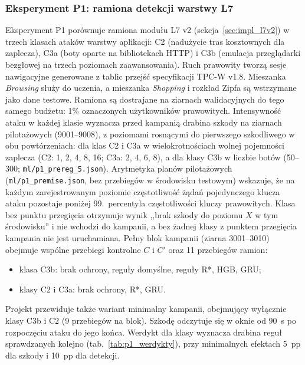 \documentclass[a4paper,12pt]{article}
\begin{document}
\subsubsection{Eksperyment P1: ramiona detekcji warstwy L7}\label{sec:exp_p1}
Eksperyment P1 porównuje ramiona modułu L7 v2 (sekcja~\ref{sec:impl_l7v2}) w trzech klasach ataków warstwy aplikacji: C2 (nadużycie tras kosztownych dla zaplecza), C3a (boty oparte na bibliotekach HTTP) i C3b (emulacja przeglądarki bezgłowej na trzech poziomach zaawansowania). Ruch prawowity tworzą sesje nawigacyjne generowane z tablic przejść specyfikacji TPC-W v1.8. Mieszanka \textit{Browsing} służy do uczenia, a mieszanka \textit{Shopping} i rozkład Zipfa są wstrzymane jako dane testowe. Ramiona są dostrajane na ziarnach walidacyjnych do tego samego budżetu: 1\% oznaczonych użytkowników prawowitych. Intensywność ataku w każdej klasie wyznacza przed kampanią drabina szkody na ziarnach pilotażowych (9001--9008), z poziomami rosnącymi do pierwszego szkodliwego w obu powtórzeniach: dla klas C2 i C3a w wielokrotnościach wolnej pojemności zaplecza (C2: 1, 2, 4, 8, 16; C3a: 2, 4, 6, 8), a dla klasy C3b w liczbie botów (50--300; \texttt{ml/p1\_prereg\_5.json}). Arytmetyka planów pilotażowych (\texttt{ml/p1\_premise.json}, bez przebiegów w środowisku testowym) wskazuje, że na każdym zarejestrowanym poziomie częstotliwość żądań pojedynczego klucza ataku pozostaje poniżej 99.~percentyla częstotliwości kluczy prawowitych. Klasa bez punktu przegięcia otrzymuje wynik ,,brak szkody do poziomu $X$ w tym środowisku'' i nie wchodzi do kampanii, a bez żadnej klasy z punktem przegięcia kampania nie jest uruchamiana. Pełny blok kampanii (ziarna 3001--3010) obejmuje wspólne przebiegi kontrolne $C$ i $C'$ oraz 11 przebiegów ramion:
\begin{itemize}
    \item klasa C3b: brak ochrony, reguły domyślne, reguły R*, HGB, GRU;
    \item klasy C2 i C3a: brak ochrony, R*, GRU.
\end{itemize}
Projekt przewiduje także wariant minimalny kampanii, obejmujący wyłącznie klasy C3b i C2 (9 przebiegów na blok). Szkodę odczytuje się w oknie od 90~s po rozpoczęciu ataku do jego końca. Werdykt dla klasy wyznacza drabina reguł sprawdzanych kolejno (tab.~\ref{tab:p1_werdykty}), przy minimalnych efektach 5~pp dla szkody i 10~pp dla detekcji.
\end{document}
